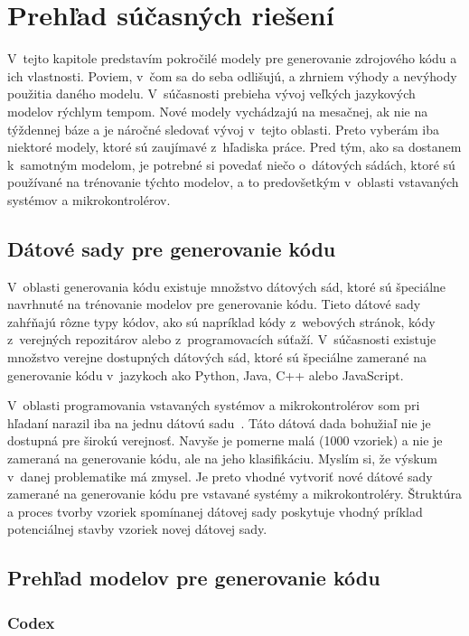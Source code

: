 \chapter{Prehľad súčasných riešení}\label{chap:survey}

V~tejto kapitole predstavím pokročilé modely pre generovanie zdrojového kódu a ich vlastnosti. Poviem, v~čom sa do seba odlišujú, a zhrniem výhody a nevýhody použitia daného modelu. V~súčasnosti prebieha vývoj veľkých jazykových modelov rýchlym tempom. Nové modely vychádzajú na mesačnej, ak nie na týždennej báze a je náročné sledovať vývoj v~tejto oblasti. Preto vyberám iba niektoré  modely, ktoré sú zaujímavé z~hľadiska práce. Pred tým, ako sa dostanem k~samotným modelom, je potrebné si povedať niečo o~dátových sádách, ktoré sú používané na trénovanie týchto modelov, a to predovšetkým v~oblasti vstavaných systémov a mikrokontrolérov.

\section{Dátové sady pre generovanie kódu}

V~oblasti generovania kódu existuje množstvo dátových sád, ktoré sú špeciálne navrhnuté na trénovanie modelov pre generovanie kódu. Tieto dátové sady zahŕňajú rôzne typy kódov, ako sú napríklad kódy z~webových stránok, kódy z~verejných repozitárov alebo z~programovacích súťaží. V~súčasnosti existuje množstvo verejne dostupných dátových sád, ktoré sú špeciálne zamerané na generovanie kódu v~jazykoch ako Python, Java, C++ alebo JavaScript.

V~oblasti programovania vstavaných systémov a mikrokontrolérov som pri hľadaní narazil iba na jednu dátovú sadu~\cite{9590539}. Táto dátová dada bohužiaľ nie je dostupná pre širokú verejnosť. Navyše je pomerne malá (1000 vzoriek) a nie je zameraná na generovanie kódu, ale na jeho klasifikáciu. Myslím si, že výskum v~danej problematike má zmysel. Je preto vhodné vytvoriť nové dátové sady zamerané na generovanie kódu pre vstavané systémy a mikrokontroléry. Štruktúra a proces tvorby vzoriek spomínanej dátovej sady poskytuje vhodný príklad potenciálnej stavby vzoriek novej dátovej sady.

\section{Prehľad modelov pre generovanie kódu}

\subsection{Codex}

